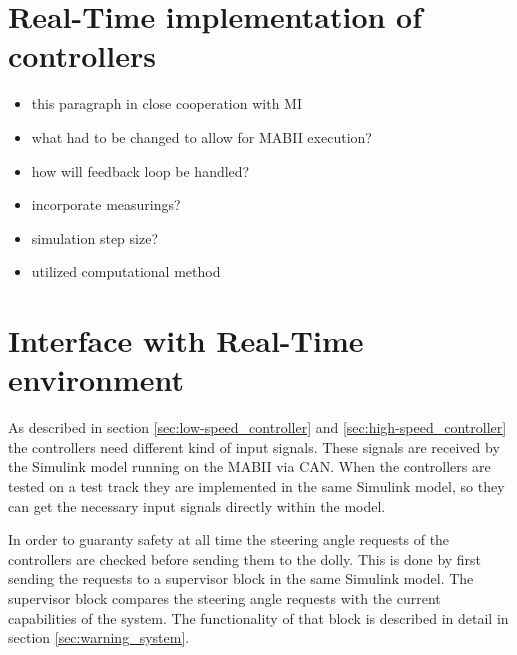 \documentclass[ExampleMasters.tex]{subfiles}
\begin{document}
\section{Real-Time implementation of controllers}
\label{sec:real_time_implementation}

\begin{itemize}
	\item this paragraph in close cooperation with MI
	\item what had to be changed to allow for \gls{MABII} execution?
	\item how will feedback loop be handled?
	\item incorporate measurings?
	\item simulation step size?
	\item utilized computational method
\end{itemize}

\section{Interface with Real-Time environment}
\label{sec:interface_with_real_time}
As described in section \ref{sec:low-speed_controller} and \ref{sec:high-speed_controller} the controllers need different kind of input signals. These signals are received by the Simulink model running on the \gls{MABII} via \gls{CAN}. When the controllers are tested on a test track they are implemented in the same Simulink model, so they can get the necessary input signals directly within the model. 

In order to guaranty safety at all time the steering angle requests of the controllers are checked before sending them to the dolly. This is done by first sending the requests to a supervisor block in the same Simulink model. The supervisor block compares the steering angle requests with the current capabilities of the system. The functionality of that block is described in detail in section \ref{sec:warning_system}.   
\end{document}
